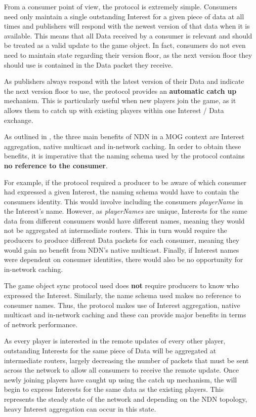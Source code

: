 From a consumer point of view, the protocol is extremely simple. Consumers need only maintain a single outstanding Interest for a given piece of data at all times and publishers will respond with the newest version of that data when it is available. This means that all Data received by a consumer is relevant and should be treated as a valid update to the game object. In fact, consumers do not even need to maintain state regarding their version floor, as the next version floor they should use is contained in the Data packet they receive.

As publishers always respond with the latest version of their Data and indicate the next version floor to use, the protocol provides an \textbf{automatic catch up} mechanism. This is particularly useful when new players join the game, as it allows them to catch up with existing players within one Interest / Data exchange.

As outlined in , the three main benefits of NDN in a MOG context are Interest aggregation, native multicast and in-network caching. In order to obtain these benefits, it is imperative that the naming schema used by the protocol contains \textbf{no reference to the consumer}.

For example, if the protocol required a producer to be aware of which consumer had expressed a given Interest, the naming schema would have to contain the consumers identity. This would involve including the consumers \textit{playerName} in the Interest's name. However, as \textit{playerNames} are unique, Interests for the same data from different consumers would have different names, meaning they would not be aggregated at intermediate routers. This in turn would require the producers to produce different Data packets for each consumer, meaning they would gain no benefit from NDN's native multicast. Finally, if Interest names were dependent on consumer identities, there would also be no opportunity for in-network caching.

The game object sync protocol used does \textbf{not} require producers to know who expressed the Interest. Similarly, the name schema used makes no reference to consumer names. Thus, the protocol makes use of Interest aggregation, native multicast and in-network caching and these can provide major benefits in terms of network performance.

As every player is interested in the remote updates of every other player, outstanding Interests for the same piece of Data will be aggregated at intermediate routers, largely decreasing the number of packets that must be sent across the network to allow all consumers to receive the remote update. Once newly joining players have caught up using the catch up mechanism, the will begin to express Interests for the same data as the existing players. This represents the steady state of the network and depending on the NDN topology, heavy Interest aggregation can occur in this state.


